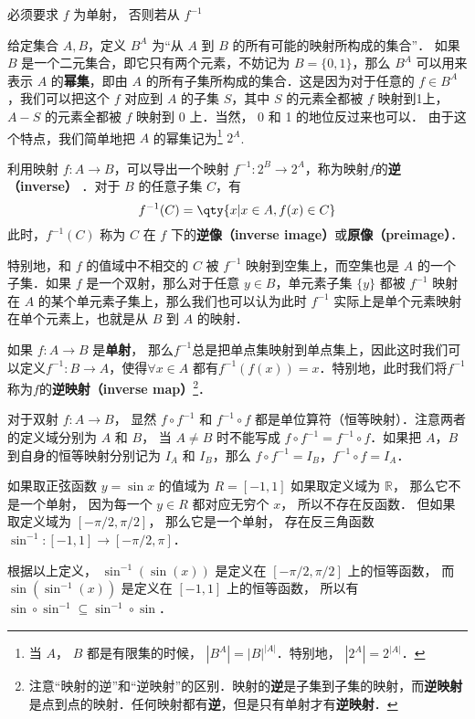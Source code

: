 必须要求 $f$ 为单射， 否则若从 $f^{-1}$ 


给定集合 $A, B$，定义 $B^A$ 为“从 $A$ 到 $B$ 的所有可能的映射所构成的集合”． 如果 $B$ 是一个二元集合，即它只有两个元素，不妨记为 $B=\{0,1\}$，那么 $B^A$ 可以用来表示 $A$ 的\textbf{幂集}，即由 $A$ 的所有子集所构成的集合．这是因为对于任意的 $f\in B^A$，我们可以把这个 $f$ 对应到 $A$ 的子集 $S$，其中 $S$ 的元素全都被 $f$ 映射到1上， $A-S$ 的元素全都被 $f$ 映射到 0 上．当然， 0 和 1 的地位反过来也可以． 由于这个特点，我们简单地把 $A$ 的幂集记为\footnote{当 $A$， $B$ 都是有限集的时候， $|B^A|=|B|^{|A|}$．特别地， $|2^A|=2^{|A|}$．}  $2^A$. 

利用映射 $f:A\to B$，可以导出一个映射 $f^{-1}:2^B \to 2^A$，称为映射$f$的\textbf{逆（inverse）} ．对于 $B$ 的任意子集 $C$，有
\begin{equation}
f^{-1}(C) = \qty{x | x \in A, f(x) \in C}
\end{equation}
此时，$f^{-1}(C)$ 称为 $C$ 在 $f$ 下的\textbf{逆像（inverse image）}或\textbf{原像（preimage）}．

特别地，和 $f$ 的值域中不相交的 $C$ 被 $f^{-1}$ 映射到空集上，而空集也是 $A$ 的一个子集．如果 $f$ 是一个双射，那么对于任意 $y\in B$，单元素子集 $\{y\}$ 都被 $f^{-1}$ 映射在 $A$ 的某个单元素子集上，那么我们也可以认为此时 $f^{-1}$ 实际上是单个元素映射在单个元素上，也就是从 $B$ 到 $A$ 的映射．

如果 $f:A\to B$ 是\textbf{单射}， 那么$f^{-1}$总是把单点集映射到单点集上，因此这时我们可以定义$f^{-1}:B\to A$，使得$\forall x\in A$ 都有$f^{-1}(f(x))=x$．特别地，此时我们将$f^{-1}$称为$f$的\textbf{逆映射（inverse map）}\footnote{注意“映射的逆”和“逆映射”的区别．映射的\textbf{逆}是子集到子集的映射，而\textbf{逆映射}是点到点的映射．任何映射都有\textbf{逆}，但是只有单射才有\textbf{逆映射}．}．

对于双射 $f:A\to B$， 显然 $f\circ f^{-1}$ 和 $f^{-1}\circ f$ 都是单位算符（恒等映射）．注意两者的定义域分别为 $A$ 和 $B$， 当 $A \ne B$ 时不能写成 $f\circ f^{-1} = f^{-1}\circ f$．如果把 $A$，$B$ 到自身的恒等映射分别记为 $I_A$ 和 $I_B$，那么 $f\circ f^{-1}=I_B$，$f^{-1}\circ f=I_A$．

\begin{example}{}
如果取正弦函数 $y = \sin x$ 的值域为 $R = [-1, 1]$ 如果取定义域为 $\mathbb R$，  那么它不是一个单射， 因为每一个 $y \in R$ 都对应无穷个 $x$， 所以不存在反函数． 但如果取定义域为 $[-\pi/2, \pi/2]$， 那么它是一个单射， 存在反三角函数 $\sin^{-1}: [-1, 1] \to [-\pi/2, \pi]$．

根据以上定义， $\sin^{-1} (\sin(x))$ 是定义在 $[-\pi/2, \pi/2]$ 上的恒等函数， 而 $\sin (\sin^{-1}(x))$ 是定义在 $[-1, 1]$ 上的恒等函数， 所以有 $\sin \circ \sin^{-1} \subseteq \sin^{-1} \circ \sin$．
\end{example}
